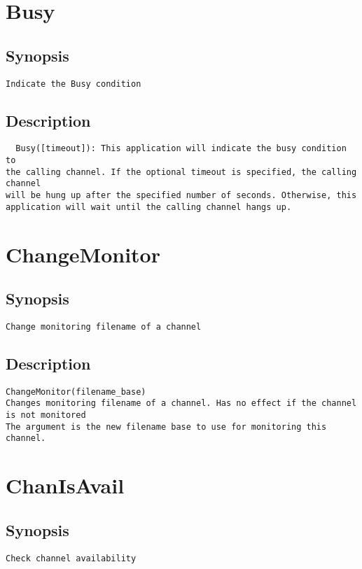 \section{Busy}
\subsection{Synopsis}
\begin{verbatim}
Indicate the Busy condition
\end{verbatim}
\subsection{Description}
\begin{verbatim}
  Busy([timeout]): This application will indicate the busy condition to
the calling channel. If the optional timeout is specified, the calling channel
will be hung up after the specified number of seconds. Otherwise, this
application will wait until the calling channel hangs up.

\end{verbatim}


\section{ChangeMonitor}
\subsection{Synopsis}
\begin{verbatim}
Change monitoring filename of a channel
\end{verbatim}
\subsection{Description}
\begin{verbatim}
ChangeMonitor(filename_base)
Changes monitoring filename of a channel. Has no effect if the channel is not monitored
The argument is the new filename base to use for monitoring this channel.

\end{verbatim}


\section{ChanIsAvail}
\subsection{Synopsis}
\begin{verbatim}
Check channel availability
\end{verbatim}
